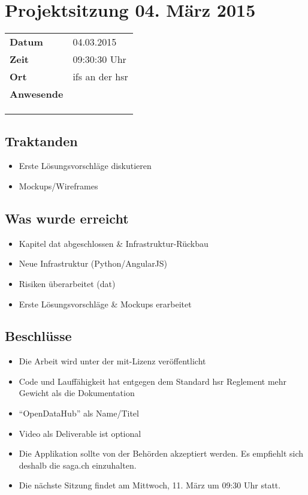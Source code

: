 \documentclass[class=scrbook,crop=false]{standalone}
\begin{document}
	
	\section{Projektsitzung 04. März 2015}
	
	\begin{tabular}{ll}
		\textbf{Datum} & 04.03.2015 \\
		\textbf{Zeit} & 09:30\textendash10:30 Uhr \\
		\textbf{Ort} & \acs{ifs} an der \acs{hsr} \\
		\textbf{Anwesende} & \proff \\ & \chuf \\ & \rlif \\ & \fscf
	\end{tabular}
	

	\subsection*{Traktanden}
	\begin{itemize}
		\item Erste Lösungsvorschläge diskutieren
		\item Mockups/Wireframes
	\end{itemize}
	
	\subsection*{Was wurde erreicht}
	\begin{itemize}
		\item Kapitel dat abgeschlossen \& Infrastruktur-Rückbau
		\item Neue Infrastruktur (Python/AngularJS)
		\item Risiken überarbeitet (dat)
		\item Erste Lösungsvorschläge \& Mockups erarbeitet
	\end{itemize}
	
	\subsection*{Beschlüsse}
	\begin{itemize}
		\item Die Arbeit wird unter der \acs{mit}-Lizenz veröffentlicht
		\item Code und Lauffähigkeit hat entgegen dem Standard \acs{hsr} Reglement mehr Gewicht als die Dokumentation
		\item ``OpenDataHub'' als Name/Titel
		\item Video als Deliverable ist optional
		\item Die Applikation sollte von der Behörden akzeptiert werden. Es empfiehlt sich deshalb die \acf{saga.ch} einzuhalten.
		\item Die nächste Sitzung findet am Mittwoch, 11. März um 09:30 Uhr statt.
	\end{itemize}
	
\end{document}
